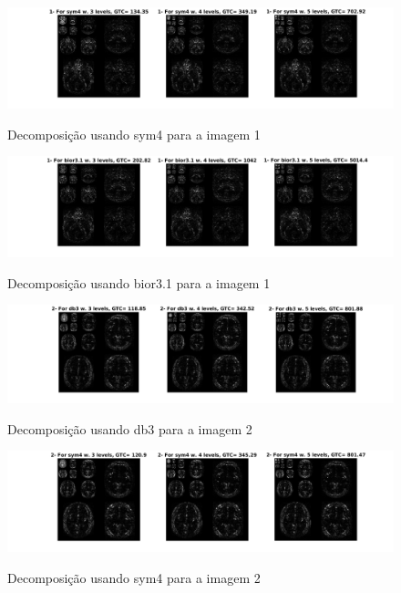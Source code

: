 \documentclass{article}
\begin{document}
\begin{figure}[H]
	\begin{center}
		\label{fig:1_sym4}
		\includegraphics[scale=0.55]{../1_sym4.png}
		\caption{Decomposição usando sym4 para a imagem 1}
	\end{center}
\end{figure}  

\begin{figure}[H]
	\begin{center}
		\label{fig:1_bior3.1}
		\includegraphics[scale=0.55]{../1_bior31.png}
		\caption{Decomposição usando bior3.1 para a imagem 1}
	\end{center}
\end{figure}  

\begin{figure}[H]
	\begin{center}
		\label{fig:2_db3}
		\includegraphics[scale=0.55]{../2_db3.png}
		\caption{Decomposição usando db3 para a imagem 2}
	\end{center}
\end{figure}  

\begin{figure}[H]
	\begin{center}
		\label{fig:2_sym4}
		\includegraphics[scale=0.55]{../2_sym4.png}
		\caption{Decomposição usando sym4 para a imagem 2}
	\end{center}
\end{figure}  
\end{document}
